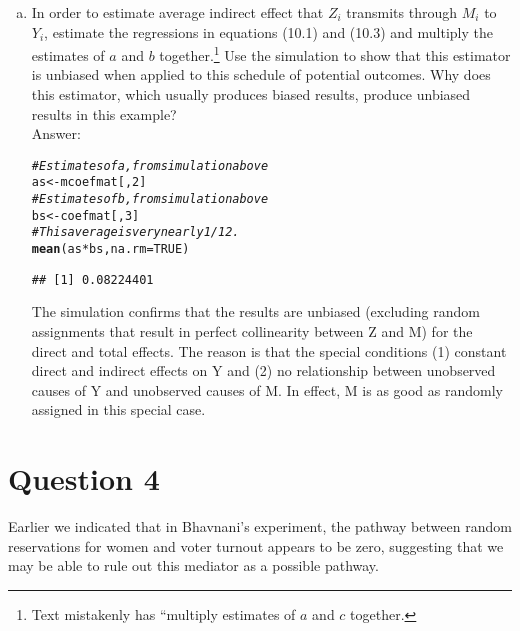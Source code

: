 \documentclass[11pt,notitlepage]{article}\usepackage[]{graphicx}\usepackage[]{color}
\makeatletter
\newcommand{\hlnum}[1]{\textcolor[rgb]{0.686,0.059,0.569}{#1}}%
\newcommand{\hlcom}[1]{\textcolor[rgb]{0.678,0.584,0.686}{\textit{#1}}}%
\newcommand{\hlopt}[1]{\textcolor[rgb]{0,0,0}{#1}}%
\newcommand{\hlstd}[1]{\textcolor[rgb]{0.345,0.345,0.345}{#1}}%
\newcommand{\hlkwb}[1]{\textcolor[rgb]{0.69,0.353,0.396}{#1}}%
\newcommand{\hlkwc}[1]{\textcolor[rgb]{0.333,0.667,0.333}{#1}}%
\newcommand{\hlkwd}[1]{\textcolor[rgb]{0.737,0.353,0.396}{\textbf{#1}}}%
\newenvironment{kframe}{%
 \def\at@end@of@kframe{}%
 \ifinner\ifhmode%
  \def\at@end@of@kframe{\end{minipage}}%
  \begin{minipage}{\columnwidth}%
 \fi\fi%
 \def\FrameCommand##1{\hskip\@totalleftmargin \hskip-\fboxsep
 \colorbox{shadecolor}{##1}\hskip-\fboxsep
     \hskip-\linewidth \hskip-\@totalleftmargin \hskip\columnwidth}%
 \MakeFramed {\advance\hsize-\width
   \@totalleftmargin\z@ \linewidth\hsize
   \@setminipage}}%
 {\par\unskip\endMakeFramed%
 \at@end@of@kframe}
\newenvironment{knitrout}{}{} %
\makeatother
\begin{document}
\begin{enumerate}[a)]
\item In order to estimate average indirect effect that $Z_i$ transmits through $M_i$ to $Y_i$, estimate the regressions in equations (10.1) and (10.3) and multiply the estimates of $a$ and $b$ together.\footnote{Text mistakenly has ``multiply estimates of $a$ and $c$ together.} Use the simulation to show that this estimator is unbiased when applied to this schedule of potential outcomes. Why does this estimator, which usually produces biased results, produce unbiased results in this example?\\
Answer:\\

\begin{knitrout}
\color{fgcolor}\begin{kframe}
\begin{alltt}
\hlcom{# Estimates of a, from simulation above}
\hlstd{as} \hlkwb{<-} \hlstd{mcoefmat[,}\hlnum{2}\hlstd{]}
\hlcom{# Estimates of b, from simulation above}
\hlstd{bs} \hlkwb{<-} \hlstd{coefmat[,}\hlnum{3}\hlstd{]}
\hlcom{# This average is very nearly 1/12.}
\hlkwd{mean}\hlstd{(as}\hlopt{*}\hlstd{bs,} \hlkwc{na.rm} \hlstd{=} \hlnum{TRUE}\hlstd{)}
\end{alltt}
\begin{verbatim}
## [1] 0.08224401
\end{verbatim}
\end{kframe}
\end{knitrout}


The simulation confirms that the results are unbiased (excluding random assignments that result in perfect collinearity between Z and M) for the direct and total effects.  The reason is that the special conditions (1) constant direct and indirect effects on Y and (2) no relationship between unobserved causes of Y and unobserved causes of M.  In effect, M is as good as randomly assigned in this special case.  

\end{enumerate}


\section*{Question 4}
Earlier we indicated that in Bhavnani's experiment, the pathway between random reservations for women and voter turnout appears to be zero, suggesting that we may be able to rule out this mediator as a possible pathway.
\end{document}
